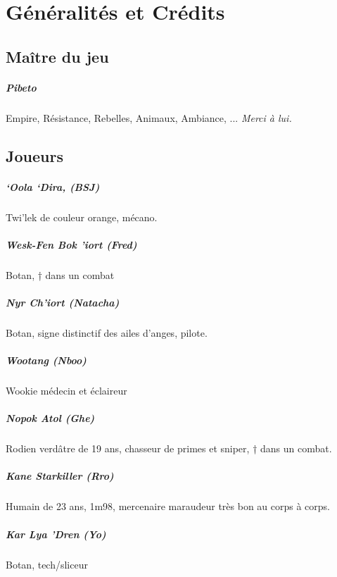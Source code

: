 \documentclass[a4paper,9pt,twoside,twocolumn,openany]{book}
\begin{document}



\chapter{Généralités et Crédits}

\section{Maître du jeu}

\paragraph{Pibeto} Empire, Résistance, Rebelles, Animaux, Ambiance, ... \emph{Merci à lui.}

\section{Joueurs}

\paragraph{`Oola `Dira, (BSJ)} Twi’lek de couleur orange, mécano.
\paragraph{Wesk-Fen Bok 'iort (Fred)} Botan, † dans un combat
\paragraph{Nyr Ch'iort (Natacha)} Botan, signe distinctif des ailes d’anges, pilote.
\paragraph{Wootang (Nboo)} Wookie médecin et éclaireur
\paragraph{Nopok Atol (Ghe)} Rodien verdâtre de 19 ans, chasseur de primes et sniper, † dans un combat.
\paragraph{Kane Starkiller (Rro)} Humain de 23 ans, 1m98, mercenaire maraudeur très bon au corps à corps.
\paragraph{Kar Lya 'Dren (Yo)} Botan, tech/sliceur
\end{document}
